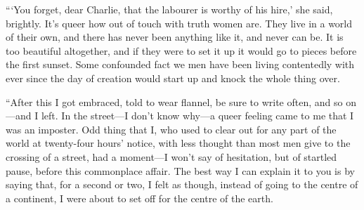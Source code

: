 \documentclass[12pt]{report}
\begin{document}
```You forget, dear Charlie, that the labourer is worthy of his hire,'
she said, brightly. It's queer how out of touch with truth women are.
They live in a world of their own, and there has never been anything
like it, and never can be. It is too beautiful altogether, and if they
were to set it up it would go to pieces before the first sunset. Some
confounded fact we men have been living contentedly with ever since the
day of creation would start up and knock the whole thing over.

``After this I got embraced, told to wear flannel, be sure to write
often, and so on---and I left. In the street---I don't know why---a
queer feeling came to me that I was an imposter. Odd thing that I, who
used to clear out for any part of the world at twenty-four hours'
notice, with less thought than most men give to the crossing of a
street, had a moment---I won't say of hesitation, but of startled pause,
before this commonplace affair. The best way I can explain it to you is
by saying that, for a second or two, I felt as though, instead of going
to the centre of a continent, I were about to set off for the centre of
the earth.
\end{document}
